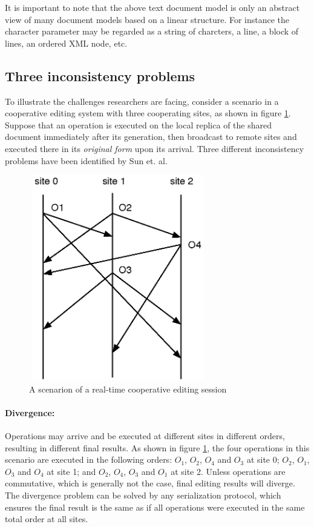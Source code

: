 \documentclass[11pt,a4paper]{article}
\begin{document}
It is important to note that the above text document model is only an abstract view of many document models based on a linear structure. For instance the character parameter may be regarded as a string of charcters, a line, a block of lines, an ordered XML node, etc.

\subsection{Three inconsistency problems}
\label{constraints}

To illustrate the challenges researchers are facing, consider a scenario in a cooperative editing system with three cooperating sites, as shown in figure \ref{fig:example1}. Suppose that an operation is executed on the local replica of the shared document immediately after its generation, then broadcast to remote sites and executed there in its \emph{original form} upon its arrival.
Three different inconsistency problems have been identified by {Sun et. al}\cite{sun98a}.

\begin{figure}
 \centering
 \includegraphics[width=3.06in,height=3.53in]{../../images/example1.eps}
 \caption{A scenarion of a real-time cooperative editing session}
 \label{fig:example1}
\end{figure}

\paragraph{Divergence:}
Operations may arrive and be executed at different sites in different orders, resulting in different final results. As shown in figure \ref{fig:example1}, the four operations in this scenario are executed in the following orders: $O_{1}$, $O_{2}$, $O_{4}$ and $O_{3}$ at site 0; $O_{2}$, $O_{1}$, $O_{3}$ and $O_{4}$ at site 1; and $O_{2}$, $O_{4}$, $O_{3}$ and $O_{1}$ at site 2. Unless operations are commutative, which is generally not the case, final editing results will diverge. The divergence problem can be solved by any serialization protocol, which ensures the final result is the same as if all operations were executed in the same total order at all sites.
\end{document}
